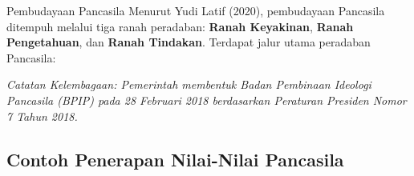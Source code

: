 \documentclass[11pt, aspectratio=169]{beamer}
\begin{document}
\begin{frame}{Pembudayaan Pancasila}
    \small Menurut Yudi Latif (2020), pembudayaan Pancasila ditempuh melalui tiga ranah peradaban: \textbf{Ranah Keyakinan}, \textbf{Ranah Pengetahuan}, dan \textbf{Ranah Tindakan}. Terdapat jalur utama peradaban Pancasila:

    \vspace{4mm}
    \begin{center}
    \end{center}
    \vspace{3mm}
    \footnotesize\textit{\color{black!60}Catatan Kelembagaan: Pemerintah membentuk Badan Pembinaan Ideologi Pancasila (BPIP) pada 28 Februari 2018 berdasarkan Peraturan Presiden Nomor 7 Tahun 2018.}
\end{frame}

\subsection{Contoh Penerapan Nilai-Nilai Pancasila}
\end{document}
